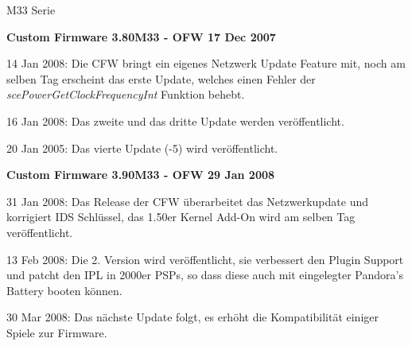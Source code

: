 \documentclass[mode=print,paper=screen,size=10pt,style=paintings]{powerdot}
\begin{document}
\begin{slide}{M33 Serie}
	\begin{large}\textbf{Custom Firmware 3.80M33 - OFW 17 Dec 2007}\end{large}	
	\begin{list}{-}{}
		\item{14 Jan 2008: Die CFW bringt ein eigenes Netzwerk Update Feature mit, noch am selben Tag erscheint das erste
			Update, welches einen Fehler der \textit{scePowerGetClockFrequencyInt} Funktion behebt.}
		\item{16 Jan 2008: Das zweite und das dritte Update werden veröffentlicht.}
		\item{20 Jan 2005: Das vierte Update (-5) wird veröffentlicht.}
	\end{list}
	\begin{large}\textbf{Custom Firmware 3.90M33 - OFW 29 Jan 2008}\end{large}	
	\begin{list}{-}{}
		\item{31 Jan 2008: Das Release der CFW überarbeitet das Netzwerkupdate und korrigiert IDS Schlüssel, das 1.50er Kernel
			Add-On wird am selben Tag veröffentlicht.}
		\item{13 Feb 2008: Die 2. Version wird veröffentlicht, sie verbessert den Plugin Support und patcht den IPL in 2000er
			PSPs, so dass diese auch mit eingelegter Pandora's Battery booten können.}
		\item{30 Mar 2008: Das nächste Update folgt, es erhöht die Kompatibilität einiger Spiele zur Firmware.}
	\end{list}
\end{slide}
\end{document}
